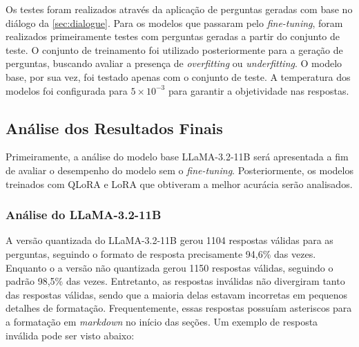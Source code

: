Os testes foram realizados através da aplicação de perguntas geradas com base no diálogo da \autoref{sec:dialogue}.
Para os modelos que passaram pelo \textit{fine-tuning}, foram realizados primeiramente testes com perguntas geradas a
partir do conjunto de teste. O conjunto de treinamento foi utilizado posteriormente para a geração de perguntas,
buscando avaliar a presença de \textit{overfitting} ou \textit{underfitting}. O modelo base, por sua vez, foi testado
apenas com o conjunto de teste. A temperatura dos modelos foi configurada para \begin{math}5 \times 10^{-3}\end{math}
para garantir a objetividade nas respostas.

\subsection{Análise dos Resultados Finais}

Primeiramente, a análise do modelo base \ac{LLaMA}-3.2-11B será apresentada a fim de avaliar o desempenho do modelo sem
o \textit{fine-tuning}. Posteriormente, os modelos treinados com \ac{QLoRA} e \ac{LoRA} que obtiveram a melhor acurácia
serão analisados.

\subsubsection{Análise do LLaMA-3.2-11B}

A versão quantizada do \ac{LLaMA}-3.2-11B gerou 1104 respostas válidas para as perguntas, seguindo o formato de
resposta
precisamente 94,6\% das vezes. Enquanto o a versão não quantizada gerou 1150 respostas válidas, seguindo o padrão
98,5\% das vezes. Entretanto, as respostas inválidas não divergiram tanto das respostas válidas, sendo que
a maioria delas estavam incorretas em pequenos detalhes de formatação. Frequentemente, essas respostas possuíam
asteriscos para a formatação em \textit{markdown} no início das seções. Um exemplo de resposta inválida pode ser visto
abaixo:

